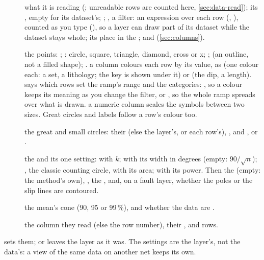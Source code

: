 \begin{description}
\item[] what it is reading (; unreadable rows are
counted here, \cref{sec:data-read}); its , empty for its dataset's; ; , a filter: an expression over each row (, ), counted as you type
(), so a layer can draw part of its dataset while the dataset stays whole; its
place in the ; and  (\cref{sec:columns}).
\item[] the points: ; : circle, square, triangle, diamond, cross or x;
;  (an outline, not a filled shape); .  a column colours each
row by its value, as  (one colour each: a set, a lithology; the key is shown under it) or
 (the dip, a length).  says which rows set the ramp's range and the
categories: , so a colour keeps its meaning as you change the filter, or , so the whole ramp spreads over what is drawn.  a numeric column scales the symbols between two
sizes. Great circles and labels follow a row's colour too.
\item[] the great and small circles: their  (else the layer's, or each row's),
, and ,  or .
\item[] the  and its one setting:  with $k$;  with its width in degrees (empty: $90/\sqrt n$); , the classic
counting circle, with its area;  with its power. Then the  (empty: the
method's own), , the , and, on a fault layer, whether the poles or the slip
lines are contoured.
\item[] the mean's cone (90, 95 or 99\,\%), and whether the data are .
\item[] the column they read (else the row number), their , and 
rows.
\end{description}  sets
them;  or  leaves the layer as it was. The settings are the layer's, not the data's: a
view of the same data on another net keeps its own.


